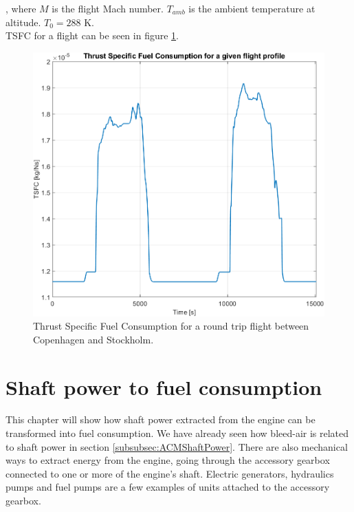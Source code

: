 \documentclass[english]{kththesis}
\begin{document}
, where $M$ is the flight Mach number. $T_{amb}$ is the ambient temperature at altitude. $T_0=288$ K.\\

TSFC for a flight can be seen in figure \ref{fig:TSFC}.

\begin{figure}[h]
    \centering
    \includegraphics[width=1\textwidth]{Epictures/TSFC.png}
    \caption{Thrust Specific Fuel Consumption for a round trip flight between Copenhagen and Stockholm.}
    \label{fig:TSFC}
\end{figure}

\cleardoublepage
\chapter{Shaft power to fuel consumption}
\label{ch:shaftpowertofuel}
This chapter will show how shaft power extracted from the engine can be transformed into fuel consumption. We have already seen how bleed-air is related to shaft power in section \ref{subsubsec:ACMShaftPower}. There are also mechanical ways to extract energy from the engine, going through the accessory gearbox connected to one or more of the engine's shaft. Electric generators, hydraulics pumps and fuel pumps are a few examples of units attached to the accessory gearbox.
\end{document}
